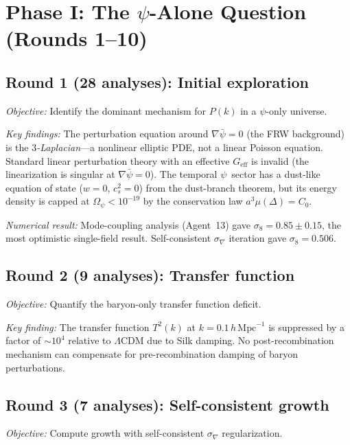 \documentclass[aps,prd,twocolumn,superscriptaddress,nofootinbib]{revtex4-2}
\newcommand{\Mpc}{\,\mathrm{Mpc}}
\newcommand{\LCDM}{\Lambda\mathrm{CDM}}
\begin{document}
\section{Phase I: The $\psi$-Alone Question (Rounds 1--10)}
\label{sec:phase1}

\subsection{Round 1 (28 analyses): Initial exploration}

\emph{Objective:} Identify the dominant mechanism for
$P(k)$ in a $\psi$-only universe.

\emph{Key findings:}
The perturbation equation around $\nabla\bar\psi=0$ (the
FRW background) is the \emph{$3$-Laplacian}---a nonlinear
elliptic PDE, not a linear Poisson equation. Standard
linear perturbation theory with an effective $G_{\mathrm{eff}}$
is invalid (the linearization is singular at
$\nabla\bar\psi=0$). The temporal $\psi$~sector has a
dust-like equation of state ($w=0$, $c_s^2=0$) from the
dust-branch theorem, but its energy density is capped at
$\Omega_\psi < 10^{-19}$ by the conservation law
$a^3\mu(\Delta)=C_0$.

\emph{Numerical result:} Mode-coupling analysis
(Agent~13) gave $\sigma_8 = 0.85\pm 0.15$, the most
optimistic single-field result. Self-consistent
$\sigma_\nabla$ iteration gave $\sigma_8 = 0.506$.

\subsection{Round 2 (9 analyses): Transfer function}

\emph{Objective:} Quantify the baryon-only transfer
function deficit.

\emph{Key finding:} The transfer function $T^2(k)$
at $k=0.1\,h\Mpc^{-1}$ is suppressed by a factor of
${\sim}10^4$ relative to $\LCDM$ due to Silk damping.
No post-recombination mechanism can compensate for
pre-recombination damping of baryon perturbations.

\subsection{Round 3 (7 analyses): Self-consistent growth}

\emph{Objective:} Compute growth with self-consistent
$\sigma_\nabla$ regularization.
\end{document}
